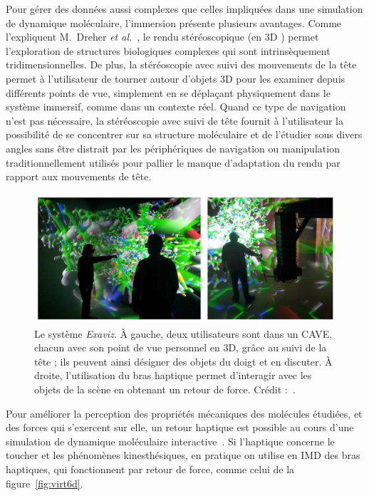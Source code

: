 	Pour gérer des données aussi complexes que celles impliquées dans une simulation de dynamique moléculaire, l'immersion présente plusieurs avantages. Comme l'expliquent M.~Dreher \emph{et al.}~\cite{dreher2014exaviz}, le rendu stéréoscopique (\og en 3D \fg{}) permet l'exploration de structures biologiques complexes qui sont intrinsèquement tridimensionnelles. De plus, la stéréoscopie avec suivi des mouvements de la tête permet à l'utilisateur de tourner autour d'objets 3D pour les examiner depuis différents points de vue, simplement en se déplaçant physiquement dans le système immersif, comme dans un contexte réel. Quand ce type de navigation n'est pas nécessaire, la stéréoscopie avec suivi de tête fournit à l'utilisateur la possibilité de se concentrer sur sa structure moléculaire et de l'étudier sous divers angles sans être distrait par les périphériques de navigation ou manipulation traditionnellement utilisés pour pallier le manque d'adaptation du rendu par rapport aux mouvements de tête.
	
	\begin{figure}[H]
		\centering
		\includegraphics[width=\textwidth]{figures/ch1/exaviz}
		\caption[IMD en environnement virtuel avec retour haptique, \emph{Exaviz}.]{Le système \emph{Exaviz}. À gauche, deux utilisateurs sont dans un CAVE\footnotemark, chacun avec son point de vue personnel en 3D, grâce au suivi de la tête ; ils peuvent ainsi désigner des objets du doigt et en discuter. À droite, l'utilisation du bras haptique permet d'interagir avec les objets de la scène en obtenant un retour de force. Crédit :~\cite{dreher2014exaviz}.}
		\label{fig:exaviz}
	\end{figure}
	
	Pour améliorer la perception des propriétés mécaniques des molécules étudiées, et des forces qui s'exercent sur elle, un retour haptique est possible au cours d'une simulation de dynamique moléculaire interactive~\cite{stone2001system}. Si l'haptique concerne le toucher et les phénomènes kinesthésiques, en pratique on utilise en IMD des bras haptiques, qui fonctionnent par retour de force, comme celui de la figure~\ref{fig:virt6d}.
	
